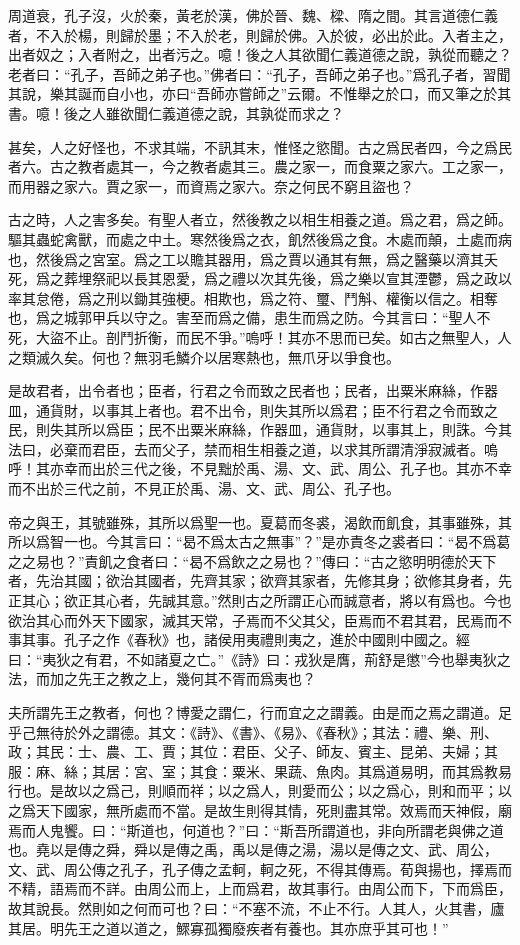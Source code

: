 \documentclass[12pt,a4paper]{ctexbook}
\begin{document}
周道衰，孔子沒，火於秦，黃老於漢，佛於晉、魏、樑、隋之間。其言道德仁義者，不入於楊，則歸於墨；不入於老，則歸於佛。入於彼，必出於此。入者主之，出者奴之；入者附之，出者污之。噫！後之人其欲聞仁義道德之說，孰從而聽之？老者曰：“孔子，吾師之弟子也。”佛者曰：“孔子，吾師之弟子也。”爲孔子者，習聞其說，樂其誕而自小也，亦曰“吾師亦嘗師之”云爾。不惟舉之於口，而又筆之於其書。噫！後之人雖欲聞仁義道德之說，其孰從而求之？\par
甚矣，人之好怪也，不求其端，不訊其末，惟怪之慾聞。古之爲民者四，今之爲民者六。古之教者處其一，今之教者處其三。農之家一，而食粟之家六。工之家一，而用器之家六。賈之家一，而資焉之家六。奈之何民不窮且盜也？\par
古之時，人之害多矣。有聖人者立，然後教之以相生相養之道。爲之君，爲之師。驅其蟲蛇禽獸，而處之中土。寒然後爲之衣，飢然後爲之食。木處而顛，土處而病也，然後爲之宮室。爲之工以贍其器用，爲之賈以通其有無，爲之醫藥以濟其夭死，爲之葬埋祭祀以長其恩愛，爲之禮以次其先後，爲之樂以宣其湮鬱，爲之政以率其怠倦，爲之刑以鋤其強梗。相欺也，爲之符、璽、鬥斛、權衡以信之。相奪也，爲之城郭甲兵以守之。害至而爲之備，患生而爲之防。今其言曰：“聖人不死，大盜不止。剖鬥折衡，而民不爭。”嗚呼！其亦不思而已矣。如古之無聖人，人之類滅久矣。何也？無羽毛鱗介以居寒熱也，無爪牙以爭食也。\par
是故君者，出令者也；臣者，行君之令而致之民者也；民者，出粟米麻絲，作器皿，通貨財，以事其上者也。君不出令，則失其所以爲君；臣不行君之令而致之民，則失其所以爲臣；民不出粟米麻絲，作器皿，通貨財，以事其上，則誅。今其法曰，必棄而君臣，去而父子，禁而相生相養之道，以求其所謂清淨寂滅者。嗚呼！其亦幸而出於三代之後，不見黜於禹、湯、文、武、周公、孔子也。其亦不幸而不出於三代之前，不見正於禹、湯、文、武、周公、孔子也。\par
帝之與王，其號雖殊，其所以爲聖一也。夏葛而冬裘，渴飲而飢食，其事雖殊，其所以爲智一也。今其言曰：“曷不爲太古之無事”？”是亦責冬之裘者曰：“曷不爲葛之之易也？”責飢之食者曰：“曷不爲飲之之易也？”傳曰：“古之慾明明德於天下者，先治其國；欲治其國者，先齊其家；欲齊其家者，先修其身；欲修其身者，先正其心；欲正其心者，先誠其意。”然則古之所謂正心而誠意者，將以有爲也。今也欲治其心而外天下國家，滅其天常，子焉而不父其父，臣焉而不君其君，民焉而不事其事。孔子之作《春秋》也，諸侯用夷禮則夷之，進於中國則中國之。經曰：“夷狄之有君，不如諸夏之亡。”《詩》曰：戎狄是膺，荊舒是懲”今也舉夷狄之法，而加之先王之教之上，幾何其不胥而爲夷也？\par
夫所謂先王之教者，何也？博愛之謂仁，行而宜之之謂義。由是而之焉之謂道。足乎己無待於外之謂德。其文：《詩》、《書》、《易》、《春秋》；其法：禮、樂、刑、政；其民：士、農、工、賈；其位：君臣、父子、師友、賓主、昆弟、夫婦；其服：麻、絲；其居：宮、室；其食：粟米、果蔬、魚肉。其爲道易明，而其爲教易行也。是故以之爲己，則順而祥；以之爲人，則愛而公；以之爲心，則和而平；以之爲天下國家，無所處而不當。是故生則得其情，死則盡其常。效焉而天神假，廟焉而人鬼饗。曰：“斯道也，何道也？”曰：“斯吾所謂道也，非向所謂老與佛之道也。堯以是傳之舜，舜以是傳之禹，禹以是傳之湯，湯以是傳之文、武、周公，文、武、周公傳之孔子，孔子傳之孟軻，軻之死，不得其傳焉。荀與揚也，擇焉而不精，語焉而不詳。由周公而上，上而爲君，故其事行。由周公而下，下而爲臣，故其說長。然則如之何而可也？曰：“不塞不流，不止不行。人其人，火其書，廬其居。明先王之道以道之，鰥寡孤獨廢疾者有養也。其亦庶乎其可也！”\par
\end{document}
